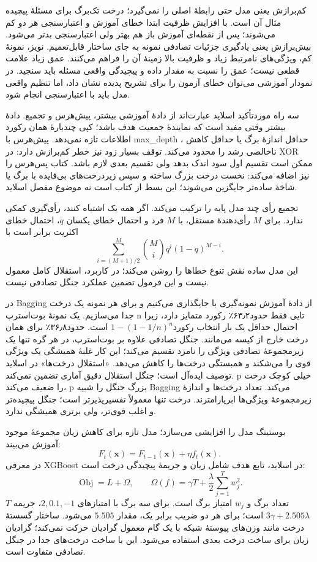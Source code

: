 \documentclass[12pt,a4paper,oneside]{report}
\begin{document}
کم‌برازش یعنی مدل حتی رابطهٔ اصلی را نمی‌گیرد؛ درخت تک‌برگ برای مسئلهٔ پیچیده مثال آن است. با افزایش ظرفیت ابتدا خطای آموزش و اعتبارسنجی هر دو کم می‌شوند؛ پس از نقطه‌ای آموزش باز هم بهتر ولی اعتبارسنجی بدتر می‌شود. بیش‌برازش یعنی یادگیری جزئیات تصادفی نمونه به جای ساختار قابل‌تعمیم. نویز، نمونهٔ کم، ویژگی‌های نامرتبط زیاد و ظرفیت بالا زمینهٔ آن را فراهم می‌کنند. عمق زیاد علامت قطعی نیست؛ عمق را نسبت به مقدار داده و پیچیدگی واقعی مسئله باید سنجید. در نمودار آموزشی می‌توان خطای آزمون را برای تشریح پدیده نشان داد، اما تنظیم واقعی مدل باید با اعتبارسنجی انجام شود.

سه راه موردتأکید اسلاید عبارت‌اند از دادهٔ آموزشی بیشتر، پیش‌هرس و تجمیع. دادهٔ بیشتر وقتی مفید است که نمایندهٔ جمعیت هدف باشد؛ کپی چندبارهٔ همان رکورد اطلاعات تازه نمی‌دهد. پیش‌هرس با max\_depth ، حداقل اندازهٔ برگ یا حداقل کاهش ناخالصی رشد را محدود می‌کند. توقف بسیار زود نیز خطر کم‌برازش دارد: در XOR ممکن است تقسیم اول سود اندک بدهد ولی تقسیم بعدی لازم باشد. کتاب پس‌هرس را نیز اضافه می‌کند: نخست درخت بزرگ ساخته و سپس زیر‌درخت‌های بی‌فایده با برگ یا شاخهٔ ساده‌تر جایگزین می‌شوند؛ این بسط از کتاب است نه موضوع مفصل اسلاید.

تجمیع  رأی چند مدل پایه را ترکیب می‌کند. اگر همه یک اشتباه کنند، رأی‌گیری کمکی ندارد. برای $M$ رأی‌دهندهٔ مستقل، با $M$ فرد و احتمال خطای یکسان $q$، احتمال خطای اکثریت برابر است با
\[\sum_{i=(M+1)/2}^{M}\binom Mi q^i(1-q)^{M-i}.\]
این مدل ساده نقش تنوع خطاها را روشن می‌کند؛ در کاربرد، استقلال کامل معمول نیست و این فرمول تضمین عملکرد جنگل تصادفی نیست.

در Bagging از دادهٔ آموزش نمونه‌گیری با جایگذاری می‌کنیم و برای هر نمونه یک درخت جدا می‌سازیم. یک نمونهٔ بوت‌استرپ n تایی فقط حدود۶۳٫۲٪ رکورد متمایز دارد، زیرا احتمال حداقل یک بار انتخاب رکورد$1-(1-1/n)^n$ است. حدود۳۶٫۸٪ برای همان درخت خارج از کیسه می‌مانند. جنگل تصادفی علاوه بر بوت‌استرپ، در هر گره تنها یک زیرمجموعهٔ تصادفی ویژگی را نامزد تقسیم می‌کند؛ این کار غلبهٔ همیشگی یک ویژگی قوی را می‌شکند و همبستگی درخت‌ها را کاهش می‌دهد. «استقلال درخت‌ها» در اسلاید توصیف ایده‌آل است؛ جنگل استقلال دقیق آماری تضمین نمی‌کند. p خیلی کوچک درخت را ضعیف می‌کند، p بزرگ جنگل را شبیه Bagging می‌کند. تعداد درخت‌ها و اندازهٔ زیرمجموعهٔ ویژگی‌ها ابرپارامترند. درخت تنها معمولاً تفسیرپذیرتر است؛ جنگل پیچیده‌تر و اغلب قوی‌تر، ولی برتری همیشگی ندارد.

بوستینگ مدل را افزایشی می‌سازد؛ مدل تازه برای کاهش زیان مجموعهٔ موجود آموزش می‌بیند:
\[F_t(\mathbf x)=F_{t-1}(\mathbf x)+\eta f_t(\mathbf x).\]
در معرفی XGBoost در اسلاید، تابع هدف شامل زیان و جریمهٔ پیچیدگی درخت است:
\[\operatorname{Obj}=L+\Omega,\qquad \Omega(f)=\gamma T+\frac\lambda2\sum_{j=1}^{T}w_j^2.\]
$T$ تعداد برگ و $w_j$ امتیاز برگ است. برای سه برگ با امتیازهای $2,0.1,-1$، جریمه $3\gamma+2.505\lambda$ است؛ برای هر دو ضریب برابر یک، مقدار $5.505$ می‌شود. ساختار گسستهٔ درخت مانند وزن‌های پیوستهٔ شبکه با یک گام معمول گرادیان حرکت نمی‌کند؛ گرادیان زیان برای ساخت درخت بعدی استفاده می‌شود. این با ساخت درخت‌های جدا در جنگل تصادفی متفاوت است.
\end{document}
